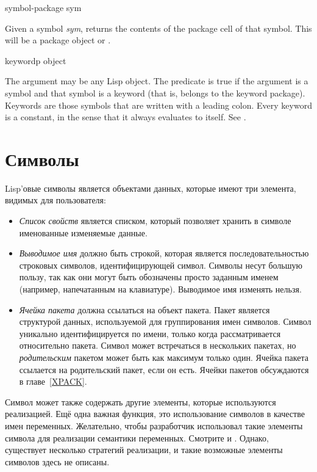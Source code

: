 \begin{defun}[Function]
symbol-package sym

Given a symbol \emph{sym},  returns the contents of the
package cell of that symbol.  This will be a package object or {\nil}.
\end{defun}

\begin{defun}[Function]
keywordp object

The argument may be any Lisp object.  The predicate  is true
if the argument is a symbol and that
symbol is a keyword (that is, belongs to the keyword
package).  Keywords are those symbols that are written with
a leading colon.  Every keyword is a constant, in the sense
that it always evaluates to itself.  See .
\end{defun}

\else

\chapter{Символы}
\label{symbol}

Lisp'овые символы является объектами данных, которые имеют три элемента, видимых
для пользователя:
\begin{itemize}
\item
\emph{Список свойств} является списком, который позволяет хранить в символе
именованные изменяемые данные.

\item
\emph{Выводимое имя} должно быть строкой, которая является последовательностью
строковых символов, идентифицирующей символ. Символы несут большую пользу, так
как они могут быть обозначены просто заданным именем (например, напечатанным на
клавиатуре).
Выводимое имя изменять нельзя.

\item
\emph{Ячейка пакета} должна ссылаться на объект пакета.
Пакет является структурой данных, используемой для группирования имен символов.
Символ уникально идентифицируется по имени, только когда рассматривается
относительно пакета. Символ может встречаться в нескольких пакетах, но
\emph{родительским} пакетом может быть как максимум только один.
Ячейка пакета ссылается на родительский пакет, если он есть.
Ячейки пакетов обсуждаются в главе~\ref{XPACK}.
\end{itemize}

Символ может также содержать другие элементы, которые используются
реализацией. Ещё одна важная функция, это использование символов в качестве
имен переменных.  Желательно, чтобы разработчик использовал такие элементы
символа для реализации семантики переменных. Смотрите  и
. Однако, существует несколько стратегий реализации, и
такие возможные элементы символов здесь не описаны.

